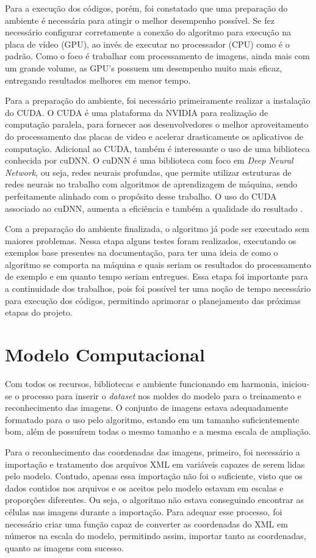 Para a execução dos códigos, porém, foi constatado que uma preparação do ambiente é necessária para atingir o melhor desempenho possível. Se fez necessário configurar corretamente a conexão do algoritmo para execução na placa de vídeo (GPU), ao invés de executar no processador (CPU) como é o padrão. Como o foco é trabalhar com processamento de imagens, ainda mais com um grande volume, as GPU's possuem um desempenho muito mais eficaz, entregando resultados melhores em menor tempo.

Para a preparação do ambiente, foi necessário primeiramente realizar a instalação do CUDA. O CUDA é uma plataforma da NVIDIA para realização de computação paralela, para fornecer aos desenvolvedores o melhor aproveitamento do processamento das placas de video e acelerar drasticamente os aplicativos de computação. Adicional ao CUDA, também é interessante o uso de uma biblioteca conhecida por cuDNN. O cuDNN é uma biblioteca com foco em \emph{Deep Neural Network}, ou seja, redes neurais profundas, que permite utilizar estruturas de redes neurais no trabalho com algoritmos de aprendizagem de máquina, sendo perfeitamente alinhado com o propósito desse trabalho. O uso do CUDA associado ao cuDNN, aumenta a eficiência e também a qualidade do resultado \cite{websiteCUDA, websiteCUDNN}.

Com a preparação do ambiente finalizada, o algoritmo já pode ser executado sem maiores problemas. Nessa etapa alguns testes foram realizados, executando os exemplos base presentes na documentação, para ter uma ideia de como o algoritmo se comporta na máquina e quais seriam os resultados do processamento de exemplo e em quanto tempo seriam entregues. Essa etapa foi importante para a continuidade dos trabalhos, pois foi possível ter uma noção de tempo necessário para execução dos códigos, permitindo aprimorar o planejamento das próximas etapas do projeto.

\section{Modelo Computacional}
Com todos os recursos, bibliotecas e ambiente funcionando em harmonia, iniciou-se o processo para inserir o \emph{dataset} nos moldes do modelo para o treinamento e reconhecimento das imagens. O conjunto de imagens estava adequadamente formatado para o uso pelo algoritmo, estando em um tamanho suficientemente bom, além de possuírem todas o mesmo tamanho e a mesma escala de ampliação.

Para o reconhecimento das coordenadas das imagens, primeiro, foi necessário a importação e tratamento dos arquivos XML em variáveis capazes de serem lidas pelo modelo. Contudo, apenas essa importação não foi o suficiente, visto que os dados contidos nos arquivos e os aceitos pelo modelo estavam em escalas e proporções diferentes. Ou seja, o algoritmo não estava conseguindo encontrar as células nas imagens durante a importação. Para adequar esse processo, foi necessário criar uma função capaz de converter as coordenadas do XML em números na escala do modelo, permitindo assim, importar tanto as coordenadas, quanto as imagens com sucesso.

